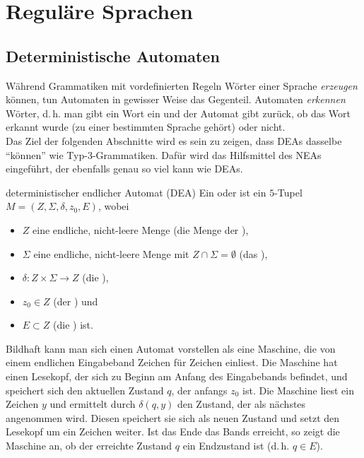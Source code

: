 \section{%
    Reguläre Sprachen%
}

\subsection{%
    Deterministische Automaten%
}

\begin{Bem}
    Während Grammatiken mit vordefinierten Regeln Wörter einer Sprache
    \emph{erzeugen} können, tun Automaten in gewisser Weise das Gegenteil.
    Automaten \emph{erkennen} Wörter, d.\,h. man gibt ein Wort ein und der
    Automat gibt zurück, ob das Wort erkannt wurde
    (zu einer bestimmten Sprache gehört) oder nicht.\\
    Das Ziel der folgenden Abschnitte wird es sein zu zeigen, dass
    DEAs dasselbe "`können"' wie Typ-3-Grammatiken.
    Dafür wird das Hilfsmittel des NEAs eingeführt, der ebenfalls genau so viel
    kann wie DEAs.
\end{Bem}

\linie

\begin{Def}{deterministischer endlicher Automat (DEA)}
    Ein 
    oder  ist ein $5$-Tupel $M = (Z, \Sigma, \delta, z_0, E)$,
    wobei
    \begin{itemize}
        \item
        $Z$ eine endliche, nicht-leere Menge
        (die Menge der ),

        \item
        $\Sigma$ eine endliche, nicht-leere Menge
        mit $Z \cap \Sigma = \emptyset$
        (das ),

        \item
        $\delta\colon Z \times \Sigma \rightarrow Z$
        (die ),

        \item
        $z_0 \in Z$ (der ) und

        \item
        $E \subset Z$ (die ) ist.
    \end{itemize}
\end{Def}

\begin{Bem}
    Bildhaft kann man sich einen Automat vorstellen als eine Maschine,
    die von einem endlichen Eingabeband Zeichen für Zeichen einliest.
    Die Maschine hat einen Lesekopf, der sich zu Beginn am Anfang des
    Eingabebands befindet, und speichert sich den aktuellen Zustand $q$,
    der anfangs $z_0$ ist.
    Die Maschine liest ein Zeichen $y$ und ermittelt durch $\delta(q, y)$
    den Zustand, der als nächstes angenommen wird.
    Diesen speichert sie sich als neuen Zustand und setzt den Lesekopf um ein
    Zeichen weiter.
    Ist das Ende das Bands erreicht, so zeigt die Maschine an,
    ob der erreichte Zustand $q$ ein Endzustand ist
    (d.\,h. $q \in E$).
\end{Bem}

